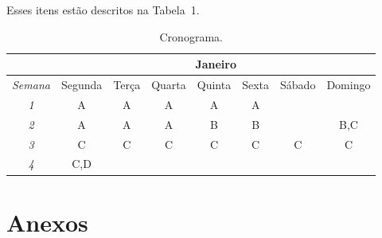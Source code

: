 \documentclass{article}
\begin{document}
Esses itens estão descritos na Tabela~1.

\begin{table}[!ht]
	\centering
	\label{tab:cronograma}
	\caption{Cronograma.}
	\begin{tabular}{c||c|c|c|c|c|c|c}
		&\multicolumn{7}{c}{Janeiro}\\%
		\hline
		\textit{Semana}&Segunda&Terça&Quarta&Quinta&Sexta&Sábado&Domingo\\
		\hline
		\hline
		\textit{1}&A&A&A&A&A&&\\
		\hline
		\textit{2}&A&A&A&B&B&&B,C\\
		\hline
		\textit{3}&C&C&C&C&C&C&C\\
		\hline	
		\textit{4}&C,D&&&&&&\\
    \end{tabular}
\end{table}

\section{Anexos}
\end{document}
